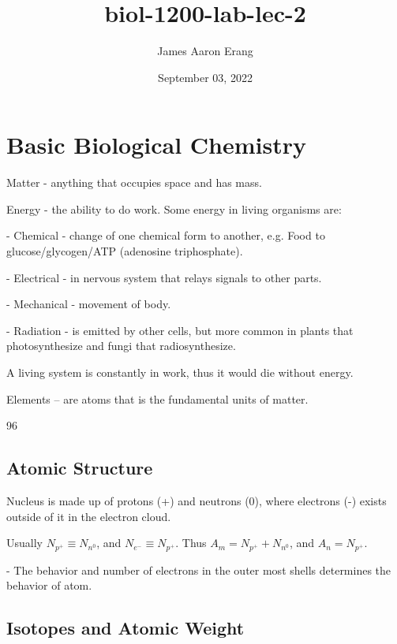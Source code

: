 \documentclass[12pt, UTF8]{article}
\title{biol-1200-lab-lec-2}
\author{James Aaron Erang}
\date{September 03, 2022}
\begin{document}
	\maketitle
	
	\section{Basic Biological Chemistry}
	
	Matter - anything that occupies space and has mass.
	
	Energy - the ability to do work. Some energy in living organisms are:
	
	- Chemical - change of one chemical form to another, e.g. Food to glucose/glycogen/ATP (adenosine triphosphate).
	
	- Electrical - in nervous system that relays signals to other parts.
	
	- Mechanical - movement of body.
	
	- Radiation - is emitted by other cells, but more common in plants that photosynthesize and fungi that radiosynthesize.
	
	A living system is constantly in work, thus it would die without energy.
	
	Elements -- are atoms that is the fundamental units of matter.
	
	96\\%
	
	\subsection*{Atomic Structure}
	
	Nucleus is made up of protons (+) and neutrons (0), where electrons (-) exists outside of it in the electron cloud.
	
	Usually $N_{p^{+}} \equiv N_{n^{0}}$, and $N_{e^{-}} \equiv N_{p^{+}}$. Thus $A_{m} = N_{p^{+}} + N_{n^{0}}$, and $A_{n} = N_{p^{+}}$.
	
	- The behavior and number of electrons in the outer most shells determines the behavior of atom.
	
	\subsection*{Isotopes and Atomic Weight}
	
\end{document}
